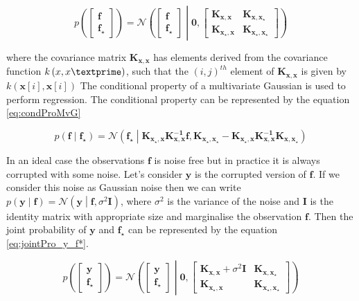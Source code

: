 \begin{equation} \label{eq:jointPro_f_f*}
p \left( \begin{bmatrix} \mathbf{f} \\\mathbf{f_\star} \end{bmatrix} \right) =
\mathcal{N}\left( \begin{bmatrix} \mathbf{f} \\\mathbf{f_\star} \end{bmatrix} \middle|
\mathbf{0}, \begin{bmatrix} \mathbf{K_{x,x}} & \mathbf{K_{x,x_\star}} \\
			    \mathbf{K_{x_\star,x}} & \mathbf{K_{x_\star,x_\star}} \end{bmatrix} \right)
\end{equation}

where the covariance matrix $ \mathbf{K_{x,x}}$ has elements derived from the covariance function $ k \left(x,x\textprime \right)$, such that the $ \left(i,j \right)^{th}$ element of $ \mathbf{K_{x,x}}$ is given by $k \left( \mathbf{x} \left[ i\right],\mathbf{x} \left[ i\right] \right) $ The conditional property of a multivariate Gaussian is used to perform regression. The conditional property can be represented by the equation \ref{eq:condProMvG}

\begin{equation} \label{eq:condProMvG}
p \left( \mathbf{f} \middle| \mathbf{f_\star} \right) =
\mathcal{N}\left( \mathbf{f_\star} \middle| \mathbf{K_{x_\star,x}}  \mathbf{K^{-1}_{x,x}} \mathbf{f,} \mathbf{K_{x_\star,x_\star}} - 
\mathbf{K_{x_\star,x}} \mathbf{K^{-1}_{x,x}} \mathbf{K_{x,x_\star}}\right)
\end{equation}

In an ideal case the observations $\mathbf{f}$ is noise free but in practice it is always corrupted with some noise. Let's consider $\mathbf{y}$ is the corrupted version of $\mathbf{f}$. If we consider this noise as Gaussian noise then we can write $p \left( \mathbf{y} \middle| \mathbf{f} \right) = \mathcal{N} \left( \mathbf{y} \middle| \mathbf{f}, \sigma^2 \mathbf{I} \right) $, where $ \sigma^2 $ is the variance of the noise and $\mathbf{I}$ is the identity matrix with appropriate size and marginalise the observation $\mathbf{f}$. Then the joint probability of $\mathbf{y}$ and $\mathbf{f_\star}$ can be represented by the equation \ref{eq:jointPro_y_f*}.

\begin{equation} \label{eq:jointPro_y_f*}
p \left( \begin{bmatrix} \mathbf{y} \\\mathbf{f_\star} \end{bmatrix} \right) =
\mathcal{N}\left( \begin{bmatrix} \mathbf{y} \\\mathbf{f_\star} \end{bmatrix} \middle|
\mathbf{0}, \begin{bmatrix} \mathbf{K_{x,x}}+ \sigma^2\mathbf{I} & \mathbf{K_{x,x_\star}} \\
			    \mathbf{K_{x_\star,x}} & \mathbf{K_{x_\star,x_\star}} \end{bmatrix} \right)
\end{equation}

